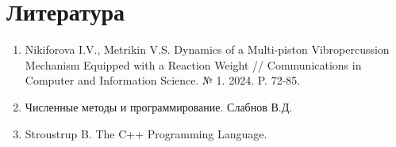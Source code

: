\section{Литература}

\begin{enumerate}
    \item Nikiforova I.V., Metrikin V.S. Dynamics of a Multi-piston Vibropercussion Mechanism Equipped with a Reaction Weight // Communications in Computer and Information Science. № 1. 2024. P. 72-85. \label{literature1}
    
    \item Численные методы и программирование. Слабнов В.Д. \label{literature2}

    \item Stroustrup B. The C++ Programming Language.
    \label{literature3}
\end{enumerate} 